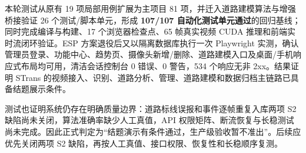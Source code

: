 本轮测试从原有 19 项局部用例扩展为主项目 81 项，并迁入道路建模算法与增强桥接验证 26 个测试/脚本单元，形成 \textbf{107/107 自动化测试单元通过}的回归基线；同时完成编译与构建、17 个浏览器检查点、65 帧真实视频 CUDA 推理和前端实时流闭环验证。ESP 方案退役后又以隔离数据库执行一次 Playwright 实测，确认管理员登录、功能中心、趋势页、摄像头新增/删除、道路建模入口及桌面/手机响应式布局均可用，清洁会话控制台 0 错误、0 警告，534 个响应无非 2xx。结果证明 STrans 的视频接入、识别、道路分析、管理、道路建模和数据归档主链路已具备结题展示条件。

测试也证明系统仍存在明确质量边界：道路标线误报和事件逐帧重复入库两项 S2 缺陷尚未关闭，算法准确率缺少人工真值，API 权限矩阵、断流恢复与长稳测试尚未完成。因此正式判定为``结题演示有条件通过，生产级验收暂不准出''。后续应优先关闭两项 S2 缺陷，再按人工真值、接口权限、恢复性和长稳顺序复测。
